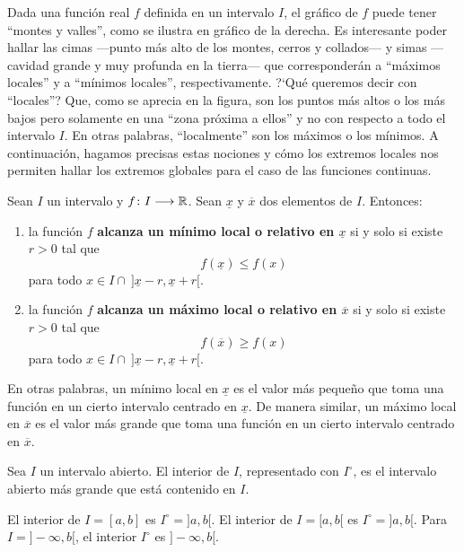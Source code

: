 Dada una función real $f$ definida en un intervalo $I$, el gráfico de $f$ puede tener ``montes y
valles'', como se ilustra en gráfico de la derecha. Es interesante poder hallar las cimas ---punto
más alto de los montes, cerros y collados--- y simas ---cavidad grande y muy profunda en la
tierra--- que corresponderán a ``máximos locales'' y a ``mínimos locales'', respectivamente. ?`Qué
queremos decir con ``locales''? Que, como se aprecia en la figura, son los puntos más altos o los
más bajos pero solamente en una ``zona próxima a ellos'' y no con respecto a todo el intervalo $I$.
En otras palabras, ``localmente'' son los máximos o los mínimos. A continuación, hagamos precisas
estas nociones y cómo los extremos locales nos permiten hallar los extremos globales para el caso
de las funciones continuas.

\begin{defical}
Sean $I$ un intervalo y $f\colon I\longrightarrow \mathbb{R}$. Sean $\underline{x}$ y $\overline{x}$ dos elementos
de $I$. Entonces:
\begin{enumerate}
\item la función $f$ \textbf{alcanza un mínimo local o relativo en $\underline{x}$} si y solo
    si existe $r > 0$ tal que
    \[
    f(\underline{x}) \leq f(x)
    \]
    para todo $x \in I \cap \ ]\underline{x} - r, \underline{x} + r[$.

\item la función $f$ \textbf{alcanza un máximo local o relativo en $\overline{x}$} si y solo si
    existe $r > 0$ tal que
    \[
    f(\overline{x}) \geq f(x)
    \]
    para todo $x \in I \cap \ ]\underline{x} - r, \underline{x} + r[$.
\end{enumerate}
\end{defical}

En otras palabras, un mínimo local en $\underline{x}$ es el valor más pequeño que toma una función
en un cierto intervalo centrado en $\underline{x}$. De manera similar, un máximo local en
$\overline{x}$ es el valor más grande que toma una función en un cierto intervalo centrado en
$\overline{x}$.

\begin{defical}
Sea $I$ un intervalo abierto. El interior de $I$, representado con $I^\circ$, es el intervalo
abierto más grande que está contenido en $I$.
\end{defical}

\begin{exemplo}[]{}
El interior de $I = [a,b]$ es $I^\circ = ]a,b[$. El interior de $I = [a,b[$ es $I^\circ = ]a,b[$.
Para $I = ]-\infty,b[$, el interior $I^\circ$ es $]-\infty, b[$.
\end{exemplo}

